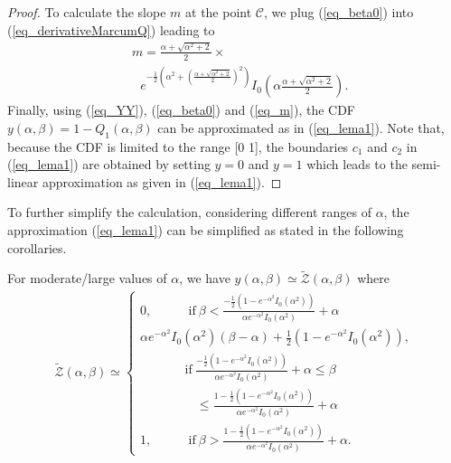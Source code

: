 \begin{proof}
To calculate the slope $m$ at the point $\mathcal{C}$, we plug (\ref{eq_beta0}) into (\ref{eq_derivativeMarcumQ}) leading to
\begin{align}\label{eq_m}
  & m = \frac{\alpha+\sqrt{\alpha^2+2}}{2}\times\nonumber\\
    & ~~~e^{-\frac{1}{2}\left(\alpha^2+\left(\frac{\alpha+\sqrt{\alpha^2+2}}{2}\right)^2\right)}I_0\left(\alpha\frac{\alpha+\sqrt{\alpha^2+2}}{2}\right).
\end{align}
Finally, using (\ref{eq_YY}), (\ref{eq_beta0}) and (\ref{eq_m}), the CDF $y(\alpha, \beta) = 1-Q_1(\alpha,\beta)$ can be approximated  as in (\ref{eq_lema1}). Note that, because the CDF is limited to the range [0 1], the boundaries $c_1$ and $c_2$ in (\ref{eq_lema1}) are obtained by setting $y=0$ and $y=1$ which leads to the semi-linear approximation as given in (\ref{eq_lema1}).
\end{proof}


To further simplify the calculation, considering different ranges of $\alpha$, the approximation (\ref{eq_lema1}) can be simplified as stated in the following corollaries. 

\begin{corollary}\label{coro1}
For moderate/large values of $\alpha$, we have $y(\alpha,\beta)\simeq\tilde{\mathcal{Z}}(\alpha,\beta)$ where
\begin{align}\label{eq_coro1}
\tilde{\mathcal{Z}}(\alpha,\beta)\simeq
\begin{cases}
0,  ~~~~~~~~~~~~~\mathrm{if}~\beta < \frac{-\frac{1}{2}\left(1-e^{-\alpha^2}I_0(\alpha^2)\right)}{\alpha e^{-\alpha^2}I_0(\alpha^2)}+\alpha  \\ 
\alpha e^{-\alpha^2}I_0(\alpha^2)(\beta-\alpha) + 
\frac{1}{2}\left(1-e^{-\alpha^2}I_0(\alpha^2)\right), \\ ~~~~~~~~~~~~~~~~\mathrm{if}~\frac{-\frac{1}{2}\left(1-e^{-\alpha^2}I_0(\alpha^2)\right)}{\alpha e^{-\alpha^2}I_0(\alpha^2)}+\alpha \leq\beta\\
~~~~~~~~~~~~~~~~~~~~\leq\frac{1-\frac{1}{2}\left(1-e^{-\alpha^2}I_0(\alpha^2)\right)}{\alpha e^{-\alpha^2}I_0(\alpha^2)}+\alpha \\
1,  ~~~~~~~~~~~~~\mathrm{if}~ \beta> \frac{1-\frac{1}{2}\left(1-e^{-\alpha^2}I_0(\alpha^2)\right)}{\alpha e^{-\alpha^2}I_0(\alpha^2)}+\alpha.
\end{cases}
\end{align}
\end{corollary}

